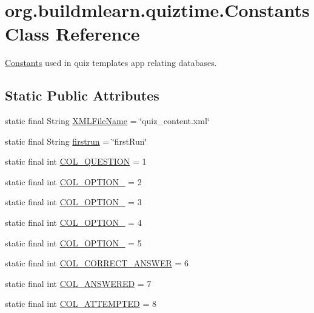 \hypertarget{classorg_1_1buildmlearn_1_1quiztime_1_1Constants}{}\section{org.\+buildmlearn.\+quiztime.\+Constants Class Reference}
\label{classorg_1_1buildmlearn_1_1quiztime_1_1Constants}


\hyperlink{classorg_1_1buildmlearn_1_1quiztime_1_1Constants}{Constants} used in quiz template\textquotesingle{}s app relating databases.  


\subsection*{Static Public Attributes}
\begin{DoxyCompactItemize}
\item 
static final String \hyperlink{classorg_1_1buildmlearn_1_1quiztime_1_1Constants_a6d969a37f1010eaca1e6760fb07dc23f}{X\+M\+L\+File\+Name} = \char`\"{}quiz\+\_\+content.\+xml\char`\"{}
\item 
static final String \hyperlink{classorg_1_1buildmlearn_1_1quiztime_1_1Constants_a653696c8eed5f1e5d71a0db369228d5e}{firstrun} = \char`\"{}first\+Run\char`\"{}
\item 
static final int \hyperlink{classorg_1_1buildmlearn_1_1quiztime_1_1Constants_add4dc851dedbb26a77cd7b02a8a1a261}{C\+O\+L\+\_\+\+Q\+U\+E\+S\+T\+I\+ON} = 1
\item 
static final int \hyperlink{classorg_1_1buildmlearn_1_1quiztime_1_1Constants_a331cf7b4a78274ee1a5b0cc5df8e0456}{C\+O\+L\+\_\+\+O\+P\+T\+I\+O\+N\+\_} = 2
\item 
static final int \hyperlink{classorg_1_1buildmlearn_1_1quiztime_1_1Constants_aa8980e1831f51a1bf6332525d7fc83c8}{C\+O\+L\+\_\+\+O\+P\+T\+I\+O\+N\+\_} = 3
\item 
static final int \hyperlink{classorg_1_1buildmlearn_1_1quiztime_1_1Constants_a3c91e9122bdc09f2ef4177ef25e9dcde}{C\+O\+L\+\_\+\+O\+P\+T\+I\+O\+N\+\_} = 4
\item 
static final int \hyperlink{classorg_1_1buildmlearn_1_1quiztime_1_1Constants_a0585a23bf76d479266c13d5e32041ffd}{C\+O\+L\+\_\+\+O\+P\+T\+I\+O\+N\+\_} = 5
\item 
static final int \hyperlink{classorg_1_1buildmlearn_1_1quiztime_1_1Constants_ad38d1d438b04f33c058e400d7cedb454}{C\+O\+L\+\_\+\+C\+O\+R\+R\+E\+C\+T\+\_\+\+A\+N\+S\+W\+ER} = 6
\item 
static final int \hyperlink{classorg_1_1buildmlearn_1_1quiztime_1_1Constants_a33c5a72adfe2d8f55ea0aa1789755b10}{C\+O\+L\+\_\+\+A\+N\+S\+W\+E\+R\+ED} = 7
\item 
static final int \hyperlink{classorg_1_1buildmlearn_1_1quiztime_1_1Constants_a7055744b8e60f1d08c816fc48d5f8deb}{C\+O\+L\+\_\+\+A\+T\+T\+E\+M\+P\+T\+ED} = 8
\end{DoxyCompactItemize}



